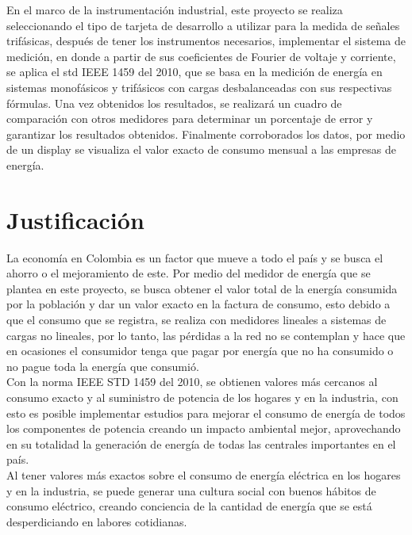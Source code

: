 En el marco de la instrumentación industrial, este proyecto se realiza seleccionando el tipo de tarjeta de desarrollo a utilizar para la medida de señales trifásicas, después de tener los instrumentos necesarios, implementar el sistema de medición, en donde a partir de sus coeficientes de Fourier de voltaje y corriente, se aplica el std IEEE 1459 del 2010, que se basa en la medición de energía en sistemas monofásicos y trifásicos con cargas desbalanceadas con sus respectivas fórmulas. Una vez obtenidos los resultados, se realizará un cuadro de comparación con otros medidores para determinar un porcentaje de error y garantizar los resultados obtenidos. Finalmente corroborados los datos, por medio de un display se visualiza el valor exacto de consumo mensual a las empresas de energía. \\



\newpage{\clearpage}
\chapter{Justificación}

La economía en Colombia es un factor que mueve a todo el país y se busca el ahorro o el mejoramiento de este. Por medio del medidor de energía que se plantea en este proyecto, se busca obtener el valor total de la energía consumida por la población y dar un valor exacto en la factura de consumo, esto debido a que el consumo que se registra, se realiza con medidores lineales a sistemas de cargas no lineales, por lo tanto, las pérdidas a la red no se contemplan y hace que en ocasiones el consumidor tenga que pagar por energía que no ha consumido o no pague toda la energía que consumió.\\

Con la norma IEEE STD 1459 del 2010, se obtienen valores más cercanos al consumo exacto y al suministro de potencia de los hogares y en la industria, con esto es posible implementar estudios para mejorar el consumo de energía de todos los componentes de potencia creando un impacto ambiental mejor, aprovechando en su totalidad la generación de energía de todas las centrales importantes en el país.\\
 
Al tener valores más exactos sobre el consumo de energía eléctrica en los hogares y en la industria, se puede generar una cultura social con buenos hábitos de consumo eléctrico, creando conciencia de la cantidad de energía que se está desperdiciando en labores cotidianas.\\

